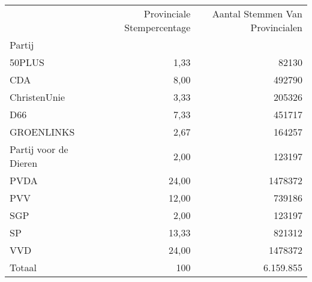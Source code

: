 \begin{tabular}{lrr}
\toprule
{} &  Provinciale Stempercentage &  Aantal Stemmen Van Provincialen \\
Partij                &                             &                                  \\
\midrule
50PLUS                &                        1,33 &                            82130 \\
CDA                   &                        8,00 &                           492790 \\
ChristenUnie          &                        3,33 &                           205326 \\
D66                   &                        7,33 &                           451717 \\
GROENLINKS            &                        2,67 &                           164257 \\
Partij voor de Dieren &                        2,00 &                           123197 \\
PVDA                  &                       24,00 &                          1478372 \\
PVV                   &                       12,00 &                           739186 \\
SGP                   &                        2,00 &                           123197 \\
SP                    &                       13,33 &                           821312 \\
VVD                   &                       24,00 &                          1478372 \\
\midrule
Totaal					&					100	&								6.159.855\\
\bottomrule
\end{tabular}

